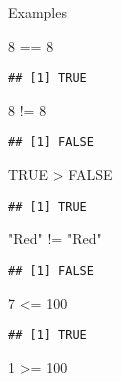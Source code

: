 \documentclass[
]{article}
\newenvironment{Shaded}{\begin{snugshade}}{\end{snugshade}}
\newcommand{\ConstantTok}[1]{\textcolor[rgb]{0.00,0.00,0.00}{#1}}
\newcommand{\DecValTok}[1]{\textcolor[rgb]{0.00,0.00,0.81}{#1}}
\newcommand{\SpecialCharTok}[1]{\textcolor[rgb]{0.00,0.00,0.00}{#1}}
\newcommand{\StringTok}[1]{\textcolor[rgb]{0.31,0.60,0.02}{#1}}
\begin{document}
Examples

\begin{Shaded}
\begin{Highlighting}[]
\DecValTok{8} \SpecialCharTok{==} \DecValTok{8}
\end{Highlighting}
\end{Shaded}

\begin{verbatim}
## [1] TRUE
\end{verbatim}

\begin{Shaded}
\begin{Highlighting}[]
\DecValTok{8} \SpecialCharTok{!=} \DecValTok{8}
\end{Highlighting}
\end{Shaded}

\begin{verbatim}
## [1] FALSE
\end{verbatim}

\begin{Shaded}
\begin{Highlighting}[]
\ConstantTok{TRUE} \SpecialCharTok{\textgreater{}} \ConstantTok{FALSE}
\end{Highlighting}
\end{Shaded}

\begin{verbatim}
## [1] TRUE
\end{verbatim}

\begin{Shaded}
\begin{Highlighting}[]
\StringTok{"Red"} \SpecialCharTok{!=} \StringTok{"Red"}
\end{Highlighting}
\end{Shaded}

\begin{verbatim}
## [1] FALSE
\end{verbatim}

\begin{Shaded}
\begin{Highlighting}[]
\DecValTok{7} \SpecialCharTok{\textless{}=} \DecValTok{100}
\end{Highlighting}
\end{Shaded}

\begin{verbatim}
## [1] TRUE
\end{verbatim}

\begin{Shaded}
\begin{Highlighting}[]
\DecValTok{1} \SpecialCharTok{\textgreater{}=} \DecValTok{100}
\end{Highlighting}
\end{Shaded}
\end{document}
